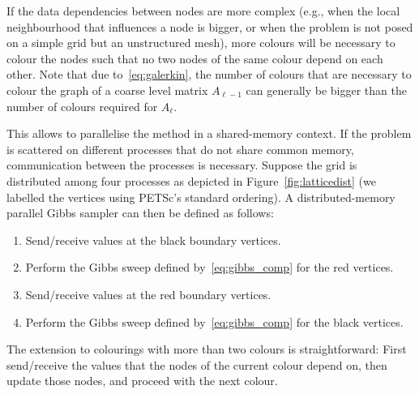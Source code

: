 \documentclass[
fontsize=11pt,
paper=a4,
numbers=noenddot
]{scrartcl}
\begin{document}
If the data dependencies between nodes are more complex (e.g., when the local neighbourhood that influences a node is bigger, or when the problem is not posed on a simple grid but an unstructured mesh), more colours will be necessary to colour the nodes such that no two nodes of the same colour depend on each other. Note that due to~\eqref{eq:galerkin}, the number of colours that are necessary to colour the graph of a coarse level matrix $A_{\ell-1}$ can generally be bigger than the number of colours required for $A_{\ell}$.

This allows to parallelise the method in a shared-memory context. If the problem is scattered on different processes that do not share common memory, communication between the processes is necessary. Suppose the grid is distributed among four processes as depicted in Figure~\ref{fig:latticedist} (we labelled the vertices using PETSc's standard ordering). A distributed-memory parallel Gibbs sampler can then be defined as follows:
\begin{enumerate}
    \item Send/receive values at the black boundary vertices.
    \item Perform the Gibbs sweep defined by~\eqref{eq:gibbs_comp} for the red vertices.
    \item Send/receive values at the red boundary vertices.
    \item Perform the Gibbs sweep defined by~\eqref{eq:gibbs_comp} for the black vertices.
\end{enumerate}
The extension to colourings with more than two colours is straightforward: First send/receive the values that the nodes of the current colour depend on, then update those nodes, and proceed with the next colour.
\end{document}
